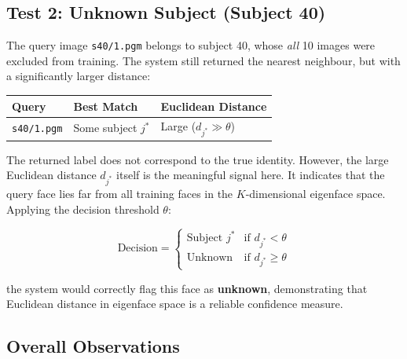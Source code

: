 \documentclass[12pt,a4paper]{article}
\begin{document}
\subsection{Test 2: Unknown Subject (Subject 40)}

The query image \texttt{s40/1.pgm} belongs to subject 40, whose \textit{all}
10 images were excluded from training. The system still returned the nearest
neighbour, but with a significantly larger distance:

\begin{center}
\begin{tabular}{lll}
\toprule
\textbf{Query} & \textbf{Best Match} & \textbf{Euclidean Distance} \\
\midrule
\texttt{s40/1.pgm} & Some subject $j^*$ & Large ($d_{j^*} \gg \theta$) \\
\bottomrule
\end{tabular}
\end{center}

The returned label does not correspond to the true identity. However, the large
Euclidean distance $d_{j^*}$ itself is the meaningful signal here. It
indicates that the query face lies far from all training faces in the
$K$-dimensional eigenface space. Applying the decision threshold $\theta$:

\[
\text{Decision} =
\begin{cases}
\text{Subject } j^* & \text{if } d_{j^*} < \theta \\
\text{Unknown}       & \text{if } d_{j^*} \geq \theta
\end{cases}
\]

the system would correctly flag this face as \textbf{unknown}, demonstrating
that Euclidean distance in eigenface space is a reliable confidence measure.

\subsection{Overall Observations}
\end{document}
